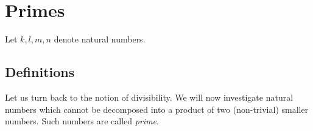 \documentclass[../../arithmetic.tex]{subfiles}
\begin{document}
  \section{Primes}

  \begin{forthel}
  \end{forthel}

  \begin{forthel}
  \end{forthel}

  \begin{forthel}
  \end{forthel}

  \begin{forthel}
  \end{forthel}

  \begin{forthel}
  \end{forthel}

  \begin{forthel}
    Let $k, l, m, n$ denote natural numbers.
  \end{forthel}


  \subsection{Definitions}

  Let us turn back to the notion of divisibility. We will now investigate
  natural numbers which cannot be decomposed into a product of two
  (non-trivial) smaller numbers. Such numbers are called \textit{prime}.
\end{document}
